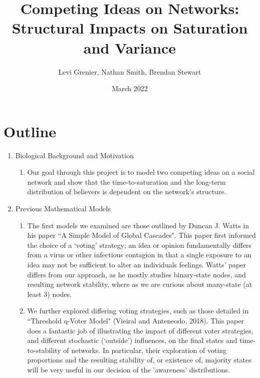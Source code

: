 \documentclass{article}
\title{Competing Ideas on Networks: \\ Structural Impacts on Saturation and Variance}
\author{Levi Grenier, Nathan Smith, Brendan Stewart}
\date{March 2022}
\begin{document}
\maketitle

\section{Outline}

\begin{enumerate}[label=\arabic*.]
    \item Biological Background and Motivation
    
        \begin{enumerate}[label=\Alph*.]
        \item Our goal through this project is to model two competing ideas on a social network and show that the time-to-saturation and the long-term distribution of believers is dependent on the network's structure.
        
    
        \end{enumerate}
    
    \item Previous Mathematical Models
    
        \begin{enumerate}[label=\Alph*.]
        \item The first models we examined are those outlined by Duncan J. Watts in his paper ``A Simple Model of Global Cascades". This paper first informed the choice of a `voting' strategy; an idea or opinion fundamentally differs from a virus or other infectious contagion in that a single exposure to an idea may not be sufficient to alter an individuals feelings. Watts' paper differs from our approach, as he mostly studies binary-state nodes, and resulting network stability, where as we are curious about many-state (at least 3) nodes. 

        \item We further explored differing voting strategies, such as those detailed in ``Threshold q-Voter Model" (Vieiral and Anteneodo, 2018). This paper does a fantastic job of illustrating the impact of different voter strategies, and different stochastic (`outside') influences, on the final states and time-to-stability of networks. In particular, their exploration of voting proportions and the resulting stability of, or existence of, majority states will be very useful in our decision of the 'awareness' distributions.  
        


\end{enumerate}
\end{enumerate}
\end{document}
